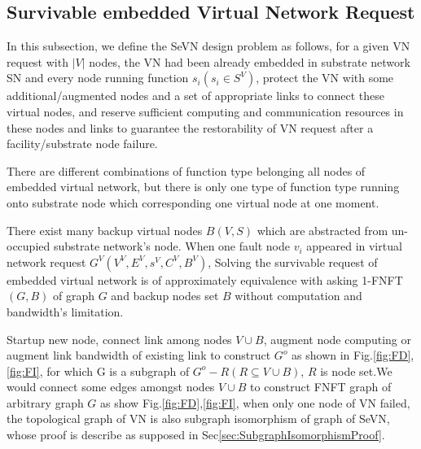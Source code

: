 



\subsection{Survivable embedded Virtual Network Request}

In this subsection, we define the SeVN design problem as follows, for a given VN request with $|V|$ nodes, the VN had been already embedded in substrate network SN and every node running function $s_i(s_i\in S^V)$, protect the VN with some additional/augmented nodes and a set of appropriate links to connect these virtual nodes, and reserve sufficient computing and communication resources in these nodes and links to guarantee the restorability of VN request after a facility/substrate node failure.


There are different combinations of function type belonging all nodes of embedded virtual network, but there is only one type of function type running onto substrate node which corresponding one virtual node at one moment.

There exist many backup virtual nodes $B(V,S)$ which are abstracted from un-occupied substrate network's node. When one fault node $v_i$ appeared in virtual network request $G^V (V^V,E^V,s^V,C^V,B^V)$, Solving the survivable request of embedded virtual network is of approximately equivalence with asking 1-FNFT$(G,B)$ of graph $G$ and backup nodes set $B$ without computation and bandwidth's limitation.

Startup new node, connect link among nodes $V\cup B$, augment node computing or augment link bandwidth of existing link to construct $G^o$ as shown in Fig.\ref{fig:FD},\ref{fig:FI}, for which G is a subgraph of $G^o-R(R \subseteq V\cup B)$, $R$ is node set.We would connect some edges amongst nodes $V\cup B$ to construct FNFT graph of arbitrary graph $G$ as show Fig.\ref{fig:FD},\ref{fig:FI}, when only one node of VN failed, the topological graph of VN is also subgraph isomorphism of graph of SeVN, whose proof is describe as supposed in Sec\ref{sec:SubgraphIsomorphismProof}. %

